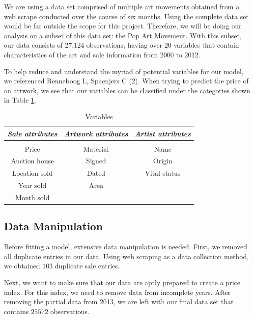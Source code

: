 \documentclass[]{asaproc}\usepackage[]{graphicx}\usepackage[]{color}
\begin{document}
We are using a data set comprised of multiple art movements obtained from a web scrape conducted over the course of six months. Using the complete data set would be far outside the scope for this project. Therefore, we will be doing our analysis on a subset of this data set: the Pop Art Movement. With this subset, our data consists of 27,124 observations; having over 20 variables that contain characteristics of the art and sale information from 2000 to 2012.

To help reduce and understand the myriad of potential variables for our model, we referenced Renneboog L, Spaenjers C (2). When trying to predict the price of an artwork, we see that our variables can be classified under the categories shown in Table \ref{att}.


\begin{table}[H]
\caption{\enspace Variables}\label{att}
\begin{tabular*}{\hsize}{@{\extracolsep{\fill}}ccc}
\\[-5pt]
\multicolumn{1}{c}{\it Sale attributes} & 
\multicolumn{1}{c}{\it Artwork attributes} & 
\multicolumn{1}{c}{\it Artist attributes}\\
\hline
\\[-5pt]
Price & Material & Name \\
Auction house & Signed & Origin\\
Location sold & Dated & Vital status\\ 
Year sold & Area & \\ 
Month sold &  & \\ 
\hline
\end{tabular*}
\end{table}


\subsection{Data Manipulation}

Before fitting a model, extensive data manipulation is needed. First, we removed all duplicate entries in our data. Using web scraping as a data collection method, we obtained $103$ duplicate sale entries. 

Next, we want to make sure that our data are aptly prepared to create a price index. For this index, we need to remove data from incomplete years. After removing the partial data from 2013, we are left with our final data set that contains $25572$ observations.
\end{document}
